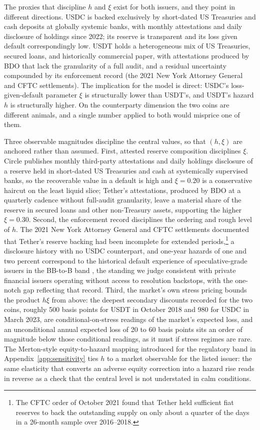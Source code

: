 The proxies that discipline $h$ and $\xi$ exist for both issuers, and they point in different directions. USDC is backed exclusively by short-dated US Treasuries and cash deposits at globally systemic banks, with monthly attestations and daily disclosure of holdings since 2022; its reserve is transparent and its loss given default correspondingly low. USDT holds a heterogeneous mix of US Treasuries, secured loans, and historically commercial paper, with attestations produced by BDO that lack the granularity of a full audit, and a residual uncertainty compounded by its enforcement record (the 2021 New York Attorney General and CFTC settlements). The implication for the model is direct: USDC's loss-given-default parameter $\xi$ is structurally lower than USDT's, and USDT's hazard $h$ is structurally higher. On the counterparty dimension the two coins are different animals, and a single number applied to both would misprice one of them.

Three observable magnitudes discipline the central values, so that $(h, \xi)$ are anchored rather than assumed. First, attested reserve composition disciplines $\xi$. Circle publishes monthly third-party attestations and daily holdings disclosure of a reserve held in short-dated US Treasuries and cash at systemically supervised banks, so the recoverable value in a default is high and $\xi = 0.20$ is a conservative haircut on the least liquid slice; Tether's attestations, produced by BDO at a quarterly cadence without full-audit granularity, leave a material share of the reserve in secured loans and other non-Treasury assets, supporting the higher $\xi = 0.30$. Second, the enforcement record disciplines the ordering and rough level of $h$. The 2021 New York Attorney General and CFTC settlements documented that Tether's reserve backing had been incomplete for extended periods,\footnote{The CFTC order of October 2021 found that Tether held sufficient fiat reserves to back the outstanding supply on only about a quarter of the days in a 26-month sample over 2016--2018.} a disclosure history with no USDC counterpart, and one-year hazards of one and two percent correspond to the historical default experience of speculative-grade issuers in the BB-to-B band \citep{sp_default_study_2025}, the standing we judge consistent with private financial issuers operating without access to resolution backstops, with the one-notch gap reflecting that record. Third, the market's own stress pricing bounds the product $h\xi$ from above: the deepest secondary discounts recorded for the two coins, roughly 500 basis points for USDT in October 2018 \citep{lyons_viswanath_natraj_2023} and 980 for USDC in March 2023, are conditional-on-stress readings of the market's expected loss, and an unconditional annual expected loss of 20 to 60 basis points sits an order of magnitude below those conditional readings, as it must if stress regimes are rare. The Merton-style equity-to-hazard mapping introduced for the regulatory band in Appendix~\ref{app:sensitivity} ties $h$ to a market observable for the listed issuer: the same elasticity that converts an adverse equity correction into a hazard rise reads in reverse as a check that the central level is not understated in calm conditions.

